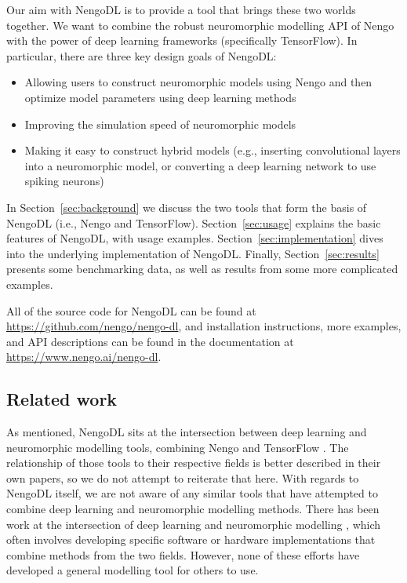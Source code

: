 \documentclass{article}
\begin{document}
Our aim with NengoDL is to provide a tool that brings these two worlds together.  We want to combine the robust neuromorphic modelling API of Nengo with the power of deep learning frameworks (specifically TensorFlow).  In particular, there are three key design goals of NengoDL:

\begin{itemize}
\item Allowing users to construct neuromorphic models using Nengo and then optimize model parameters using deep learning methods
\item Improving the simulation speed of neuromorphic models
\item Making it easy to construct hybrid models (e.g., inserting convolutional layers into a neuromorphic model, or converting a deep learning network to use spiking neurons)
\end{itemize}

In Section~\ref{sec:background} we discuss the two tools that form the basis of NengoDL (i.e., Nengo and TensorFlow).  Section~\ref{sec:usage} explains the basic features of NengoDL, with usage examples.  Section~\ref{sec:implementation} dives into the underlying implementation of NengoDL.  Finally, Section~\ref{sec:results} presents some benchmarking data, as well as results from some more complicated examples.

All of the source code for NengoDL can be found at \url{https://github.com/nengo/nengo-dl}, and installation instructions, more examples, and API descriptions can be found in the documentation at \url{https://www.nengo.ai/nengo-dl}.

\subsection{Related work}

As mentioned, NengoDL sits at the intersection between deep learning and neuromorphic modelling tools, combining Nengo \citep{Bekolay2014} and TensorFlow \citep{Abadi2016}.  The relationship of those tools to their respective fields is better described in their own papers, so we do not attempt to reiterate that here.  With regards to NengoDL itself, we are not aware of any similar tools that have attempted to combine deep learning and neuromorphic modelling methods.  There has been work at the intersection of deep learning and neuromorphic modelling \citep[e.g.,][]{Esser2015,Hunsberger2015,Kriegeskorte2015,Yamins2016,Lee2016}, which often involves developing specific software or hardware implementations that combine methods from the two fields. However, none of these efforts have developed a general modelling tool for others to use.
\end{document}
